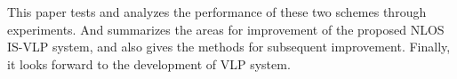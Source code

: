 \begin{abstractEN}
This paper tests and analyzes the performance of these two schemes through experiments. And summarizes the areas for improvement of the proposed NLOS IS-VLP system, and also gives the methods for subsequent improvement. Finally, it looks forward to the development of VLP system.



\end{abstractEN}

	

